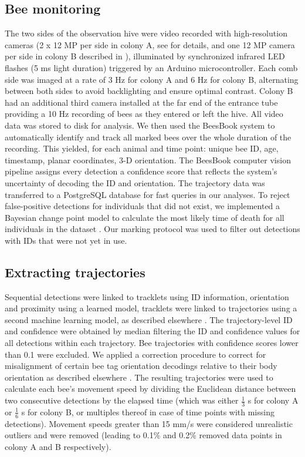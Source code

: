 \documentclass{article}
\begin{document}
\subsection*{Bee monitoring}
The two sides of the observation hive were video recorded with high-resolution cameras (2 x 12 MP per side in colony A, see \cite{wario_automatic_2015} for details, and one 12 MP camera per side in colony B described in \cite{wild_social_2021}), illuminated by synchronized infrared LED flashes (5 ms light duration) triggered by an Arduino microcontroller. Each comb side was imaged at a rate of 3 Hz for colony A and 6 Hz for colony B, alternating between both sides to avoid backlighting and ensure optimal contrast. Colony B had an additional third camera installed at the far end of the entrance tube providing a 10 Hz recording of bees as they entered or left the hive. All video data was stored to disk for analysis. We then used the BeesBook system \cite{wario_automatic_2015, wario_automatic_2017, sixt_rendergan:_2018, wild_automatic_2018, boenisch_tracking_2018, wild_social_2021, dormagen_machine_2023} to automatically identify and track all marked bees over the whole duration of the recording. This yielded, for each animal and time point: unique bee ID, age, timestamp, planar coordinates, 3-D orientation. The BeesBook computer vision pipeline assigns every detection a confidence score that reflects the system’s uncertainty of decoding the ID and orientation. The trajectory data was transferred to a PostgreSQL database for fast queries in our analyses. To reject false-positive detections for individuals that did not exist, we implemented a Bayesian change point model to calculate the most likely time of death for all individuals in the dataset \cite{wild_social_2021}. Our marking protocol was used to filter out detections with IDs that were not yet in use.

\subsection*{Extracting trajectories}
Sequential detections were linked to tracklets using ID information, orientation and proximity using a learned model, tracklets were linked to trajectories using a second machine learning model, as described elsewhere \cite{boenisch_tracking_2018}. The trajectory-level ID and confidence were obtained by median filtering the ID and confidence values for all detections within each trajectory. Bee trajectories with confidence scores lower than 0.1 were excluded. We applied a correction procedure to correct for misalignment of certain bee tag orientation decodings relative to their body orientation as described elsewhere \cite{dormagen_machine_2023}. The resulting trajectories were used to calculate each bee’s movement speed by dividing the Euclidean distance between two consecutive detections by the elapsed time (which was either $\frac{1}{3}$ s for colony A or $\frac{1}{6}$ s for colony B, or multiples thereof in case of time points with missing detections). Movement speeds greater than 15 mm/s were considered unrealistic outliers and were removed (leading to 0.1\% and 0.2\% removed data points in colony A and B respectively).
\end{document}
